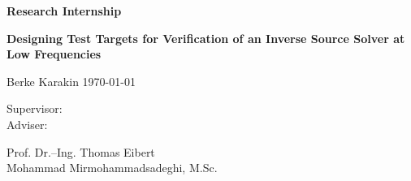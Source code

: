 
\begin{titlepage}

	\linespread{1}	
		\vspace*{-1cm}
		\hftheader
		
		\vspace{8cm}
		\Huge
		\textbf{Research Internship}
		\vspace{2cm}
		\LARGE
		\begin{flushleft}	
			\textbf{Designing Test Targets for Verification of an Inverse
				Source Solver at Low Frequencies}
		\end{flushleft}
		\vspace{2cm}
		Berke Karakin  \qquad \qquad \today \\[3cm] 
		\large	
	\parbox[b][3cm][t]{2.2cm}{
	        Supervisor: \\
	        Adviser: }
	\parbox[b][3cm][t]{8cm}{
	        Prof. Dr.--Ing. Thomas Eibert\\
	        Mohammad Mirmohammadsadeghi, M.Sc.
	        }				
\end{titlepage}	
